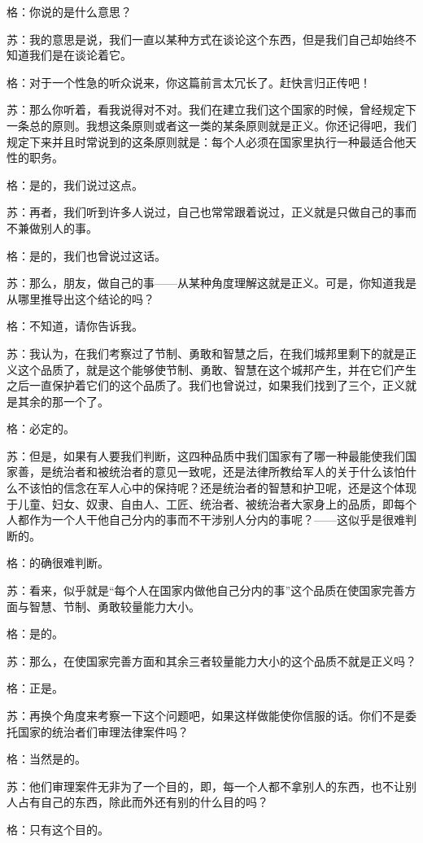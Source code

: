 \documentclass[12pt,oneside]{book}
\begin{document}
格：你说的是什么意思？

苏：我的意思是说，我们一直以某种方式在谈论这个东西，但是我们自己却始终不知道我们是在谈论着它。

格：对于一个性急的听众说来，你这篇前言太冗长了。赶快言归正传吧！

苏：那么你听着，看我说得对不对。我们在建立我们这个国家的时候，曾经规定下一条总的原则。我想这条原则或者这一类的某条原则就是正义。你还记得吧，我们规定下来并且时常说到的这条原则就是：每个人必须在国家里执行一种最适合他天性的职务。

格：是的，我们说过这点。

苏：再者，我们听到许多人说过，自己也常常跟着说过，正义就是只做自己的事而不兼做别人的事。

格：是的，我们也曾说过这话。

苏：那么，朋友，做自己的事——从某种角度理解这就是正义。可是，你知道我是从哪里推导出这个结论的吗？

格：不知道，请你告诉我。

苏：我认为，在我们考察过了节制、勇敢和智慧之后，在我们城邦里剩下的就是正义这个品质了，就是这个能够使节制、勇敢、智慧在这个城邦产生，并在它们产生之后一直保护着它们的这个品质了。我们也曾说过，如果我们找到了三个，正义就是其余的那一个了。

格：必定的。

苏：但是，如果有人要我们判断，这四种品质中我们国家有了哪一种最能使我们国家善，是统治者和被统治者的意见一致呢，还是法律所教给军人的关于什么该怕什么不该怕的信念在军人心中的保持呢？还是统治者的智慧和护卫呢，还是这个体现于儿童、妇女、奴隶、自由人、工匠、统治者、被统治者大家身上的品质，即每个人都作为一个人干他自己分内的事而不干涉别人分内的事呢？——这似乎是很难判断的。

格：的确很难判断。

苏：看来，似乎就是“每个人在国家内做他自己分内的事”这个品质在使国家完善方面与智慧、节制、勇敢较量能力大小。

格：是的。

苏：那么，在使国家完善方面和其余三者较量能力大小的这个品质不就是正义吗？

格：正是。

苏：再换个角度来考察一下这个问题吧，如果这样做能使你信服的话。你们不是委托国家的统治者们审理法律案件吗？

格：当然是的。

苏：他们审理案件无非为了一个目的，即，每一个人都不拿别人的东西，也不让别人占有自己的东西，除此而外还有别的什么目的吗？

格：只有这个目的。
\end{document}
